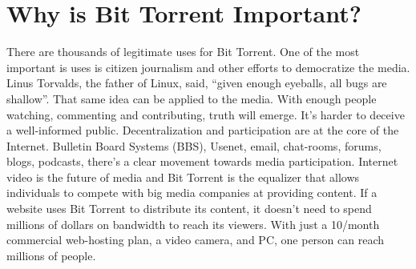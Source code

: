 \documentclass[a4paper,12pt]{report}
\begin{document}
\section{Why is Bit Torrent Important?}
There are thousands of legitimate uses for Bit Torrent. One of the most important is uses is citizen journalism and other efforts to democratize the media. Linus Torvalds, the father of Linux, said, “given enough eyeballs, all bugs are shallow”. That same idea can be applied to the media. With enough people watching, commenting and contributing, truth will emerge. It’s harder to deceive a well-informed public. 
Decentralization and participation are at the core of the Internet. Bulletin Board Systems (BBS), Usenet, email, chat-rooms, forums, blogs, podcasts, there’s a clear movement towards media participation. Internet video is the future of media and Bit Torrent is the equalizer that allows individuals to compete with big media companies at providing content. If a website uses Bit Torrent to distribute its content, it doesn’t need to spend millions of dollars on bandwidth to reach its viewers. With just a 10/month commercial web-hosting plan, a video camera, and PC, one person can reach millions of people.
\end{document}

